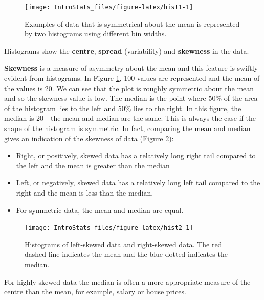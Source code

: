 \documentclass[
  oneside]{krantz}
\begin{document}
\begin{figure}

{\centering \texttt{[image: IntroStats\_files/figure-latex/hist1-1]} 

}

\caption{Examples of data that is symmetrical about the mean is represented by two histograms using different bin widths.}\label{fig:hist1}
\end{figure}

Histograms show the \textbf{centre}, \textbf{spread} (variability) and \textbf{skewness} in the data.

\textbf{Skewness} is a measure of asymmetry about the mean and this feature is swiftly evident from histograms. In Figure \ref{fig:hist1}, 100 values are represented and the mean of the values is 20. We can see that the plot is roughly symmetric about the mean and so the skewness value is low. The median is the point where 50\% of the area of the histogram lies to the left and 50\% lies to the right. In this figure, the median is 20 - the mean and median are the same. This is always the case if the shape of the histogram is symmetric. In fact, comparing the mean and median gives an indication of the skewness of data (Figure \ref{fig:hist2}):

\begin{itemize}
\item
  Right, or positively, skewed data has a relatively long right tail compared to the left and the mean is greater than the median
\item
  Left, or negatively, skewed data has a relatively long left tail compared to the right and the mean is less than the median.
\item
  For symmetric data, the mean and median are equal.
\end{itemize}

\begin{figure}

{\centering \texttt{[image: IntroStats\_files/figure-latex/hist2-1]} 

}

\caption{Histograms of left-skewed data and right-skewed data. The red dashed line indicates the mean and the blue dotted indicates the median.}\label{fig:hist2}
\end{figure}

For highly skewed data the median is often a more appropriate measure of the centre than the mean, for example, salary or house prices.
\end{document}

